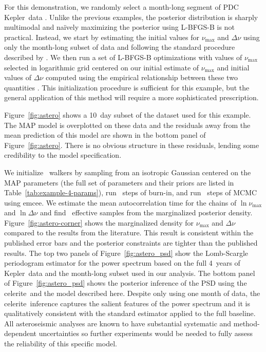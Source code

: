 \documentclass[manuscript, letterpaper]{aastex6}
\newcommand{\project}[1]{\textsf{#1}}
\newcommand{\kepler}{\project{Kepler}}
\newcommand{\celerite}{\project{celerite}}
\newcommand{\emcee}{\project{emcee}}
\newcommand{\figureref}[1]{\ref{fig:#1}}
\newcommand{\Figure}[1]{Figure~\figureref{#1}}
\newcommand{\response}[1]{{\color{blue}#1}}
\begin{document}
\response{For this demonstration, we randomly select a month-long segment of
PDC \kepler\ data \citep{Stumpe:2012, Smith:2012}.
Unlike the previous examples, the posterior distribution is sharply
multimodal and na\"ively maximizing the posterior using \project{L-BFGS-B} is
not practical.
Instead, we start by estimating the initial values for $\nu_\mathrm{max}$ and
$\Delta\nu$ using only the month-long subset of data and following the
standard procedure described by \citet{Huber:2009}.
We then run a set of \project{L-BFGS-B} optimizations with values of
$\nu_\mathrm{max}$ selected in logarithmic grid centered on our initial
estimate of $\nu_\mathrm{max}$ and initial values of $\Delta\nu$ computed
using the empirical relationship between these two quantities
\citep{Stello:2009}.
This initialization procedure is sufficient for this example, but the general
application of this method will require a more sophisticated prescription.

\Figure{astero} shows a 10~day subset of the dataset used for this example.
The MAP model is overplotted on these data and the residuals away from the
mean prediction of this model are shown in the bottom panel of
\Figure{astero}.
There is no obvious structure in these residuals, lending some credibility to
the model specification.

We initialize \exampleivnwalkers~walkers by sampling from an isotropic
Gaussian centered on the MAP parameters (the full set of parameters and their
priors are listed in Table~\ref{tab:example-4-params}), run
\exampleivnburn~steps of burn-in, and run \exampleivnsteps~steps of MCMC using
\emcee.
We estimate the mean autocorrelation time for the chains of
$\ln\nu_\mathrm{max}$ and $\ln\Delta\nu$ and find \exampleivneff\ effective
samples from the marginalized posterior density.
\Figure{astero-corner} shows the marginalized density for $\nu_\mathrm{max}$
and $\Delta\nu$ compared to the results from the literature.
This result is consistent within the published error bars and the posterior
constraints are tighter than the published results.
The top two panels of \Figure{astero_psd} show the Lomb-Scargle periodogram
\citep{VanderPlas:2017} estimator for the power spectrum based on the full
4~years of \kepler\ data and the month-long subset used in our analysis.
The bottom panel of \Figure{astero_psd} shows the posterior inference of the
PSD using the \celerite\ and the model described here.
Despite only using one month of data, the \celerite\ inference captures the
salient features of the power spectrum and it is qualitatively consistent with
the standard estimator applied to the full baseline.
All asteroseismic analyses are known to have substantial systematic and
method-dependent uncertainties \citep{Verner:2011} so further experiments
would be needed to fully assess the reliability of this specific model.

}
\end{document}
